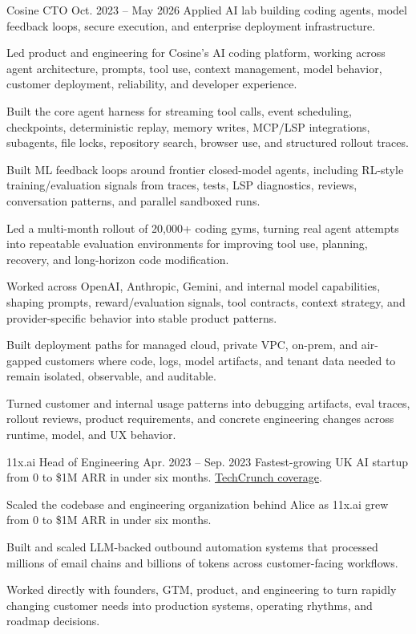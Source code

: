 
\ResumeJob
  {Cosine}
  {CTO}
  {Oct. 2023 -- May 2026}
  {Applied AI lab building coding agents, model feedback loops, secure execution, and enterprise deployment infrastructure.}
\begin{ResumeList}
  \item Led product and engineering for Cosine's AI coding platform, working across agent architecture, prompts, tool use, context management, model behavior, customer deployment, reliability, and developer experience.
  \item Built the core agent harness for streaming tool calls, event scheduling, checkpoints, deterministic replay, memory writes, MCP/LSP integrations, subagents, file locks, repository search, browser use, and structured rollout traces.
  \item Built ML feedback loops around frontier closed-model agents, including RL-style training/evaluation signals from traces, tests, LSP diagnostics, reviews, conversation patterns, and parallel sandboxed runs.
  \item Led a multi-month rollout of 20,000+ coding gyms, turning real agent attempts into repeatable evaluation environments for improving tool use, planning, recovery, and long-horizon code modification.
  \item Worked across OpenAI, Anthropic, Gemini, and internal model capabilities, shaping prompts, reward/evaluation signals, tool contracts, context strategy, and provider-specific behavior into stable product patterns.
  \item Built deployment paths for managed cloud, private VPC, on-prem, and air-gapped customers where code, logs, model artifacts, and tenant data needed to remain isolated, observable, and auditable.
  \item Turned customer and internal usage patterns into debugging artifacts, eval traces, rollout reviews, product requirements, and concrete engineering changes across runtime, model, and UX behavior.
\end{ResumeList}

\ResumeJob
  {11x.ai}
  {Head of Engineering}
  {Apr. 2023 -- Sep. 2023}
  {Fastest-growing UK AI startup from 0 to \$1M ARR in under six months. \href{https://techcrunch.com/2023/08/11/11xai-closes-2-million-pre-seed-to-create-autonomous-ai-workers/}{TechCrunch coverage}.}
\begin{ResumeList}
  \item Scaled the codebase and engineering organization behind Alice as 11x.ai grew from 0 to \$1M ARR in under six months.
  \item Built and scaled LLM-backed outbound automation systems that processed millions of email chains and billions of tokens across customer-facing workflows.
  \item Worked directly with founders, GTM, product, and engineering to turn rapidly changing customer needs into production systems, operating rhythms, and roadmap decisions.
\end{ResumeList}


